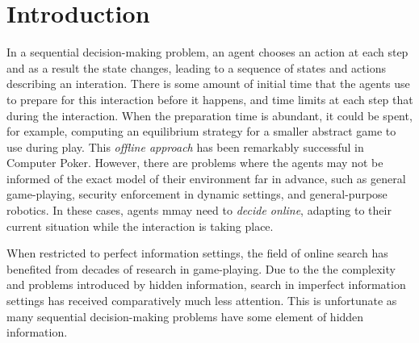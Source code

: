 \documentclass[letterpaper]{article}
\begin{document}
\section{Introduction}


In a sequential decision-making problem, an agent chooses an action at each step and as a result the state changes, 
leading to a sequence of states and actions describing an interation. There is some amount of initial time %
that the agents use to prepare for this interaction before it happens, and time limits at each step that during the interaction.
When the preparation time is abundant, it could be spent, for example, 
computing an equilibrium strategy for a smaller abstract game to use during play. This {\it offline approach} has been remarkably 
successful in Computer Poker.
However, there are problems where the agents may not be informed of the exact model of their environment far in advance, such as general 
game-playing, security enforcement in dynamic settings, and general-purpose robotics. In these cases, agents mmay need to {\it decide online}, adapting to
their current situation while the interaction is taking place.

When restricted to perfect information settings, the field of online search has benefited 
from decades of research in game-playing. 
Due to the the complexity and problems introduced by hidden information, search in imperfect information settings has received 
comparatively much less attention. This is unfortunate as many sequential decision-making problems have some element of hidden information. 
\end{document}
